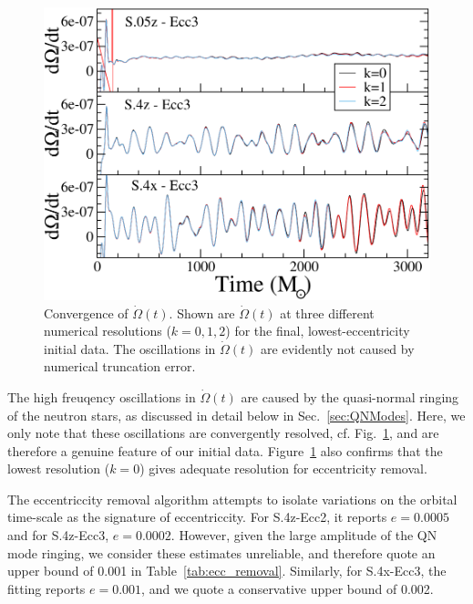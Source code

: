 \documentclass[aps,prd,amsmath,floatfix
,twocolumn
,superscriptaddress,nofootinbib,showpacs]{revtex4-1}
\theoremstyle{plain} \newtheorem{thm}{Theorem} \newtheorem{lem}{Lemma}
\begin{document}
\begin{figure}
\includegraphics[width=0.92\columnwidth]{OmegaDotComparison}
\caption{ {\label{fig:OmegaDotComparison}Convergence of $\dot\Omega(t)$.  
Shown are $\dot\Omega(t)$  at three different numerical resolutions ($k=0,1,2$) for the
final, lowest-eccentricity initial data.  The oscillations in $\dot\Omega(t)$ are 
evidently not caused by numerical truncation error.}}
\end{figure}

The high freuqency oscillations in $\dot\Omega(t)$ are caused by the
quasi-normal ringing of the neutron stars, as discussed in detail
below in Sec.~\ref{sec:QNModes}.  Here, we only note that these
oscillations are convergently resolved,
cf. Fig.~\ref{fig:OmegaDotComparison}, and are therefore a genuine
feature of our initial data.  Figure~\ref{fig:OmegaDotComparison} also
confirms that the lowest resolution ($k=0$) gives adequate resolution
for eccentricity removal.

The eccentriccity removal algorithm attempts to isolate variations on
the orbital time-scale as the signature of eccentriccity. For
S.4z-Ecc2, it reports $e=0.0005$ and for S.4z-Ecc3, $e=0.0002$.
However, given the large amplitude of the QN mode ringing, we consider
these estimates unreliable, and therefore quote an upper bound of
0.001 in Table~\ref{tab:ecc_removal}. Similarly, for S.4x-Ecc3, the fitting
reports $e=0.001$, and we quote a conservative upper bound of 0.002.
\end{document}
